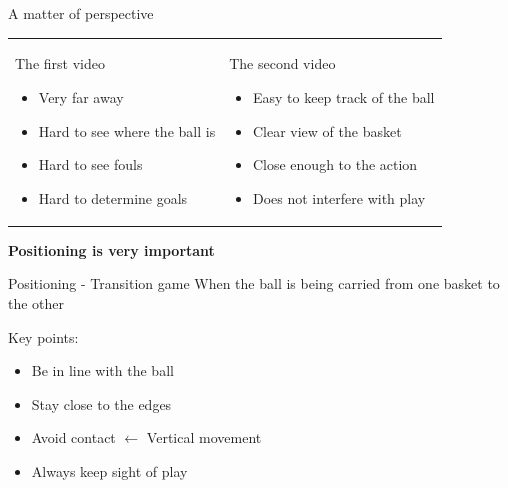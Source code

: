 \documentclass{beamer}
\begin{document}
    \begin{frame}{A matter of perspective}
        \begin{tabular}{ll}
            \parbox{0.5\linewidth}{
                The first video
                \begin{itemize}
                    \item Very far away
                    \item Hard to see where the ball is
                    \item Hard to see fouls
                    \item Hard to determine goals
                \end{itemize}
                \pause
            }
            &
            \parbox{0.5\linewidth}{
                The second video
                \begin{itemize}
                    \item Easy to keep track of the ball
                    \item Clear view of the basket
                    \item Close enough to the action
                    \item Does not interfere with play
                \end{itemize}
            }
        \end{tabular}
        \pause
        \begin{center}
            \textbf{Positioning is very important}
        \end{center}
    \end{frame}

    \begin{frame}{Positioning - Transition game}
        When the ball is being carried from one basket to the other

        \pause

        \vspace{0.75cm}

        Key points:
        \begin{itemize}
            \item Be in line with the ball
            \item Stay close to the edges
            \item Avoid contact $\leftarrow$ Vertical movement
            \item Always keep sight of play
        \end{itemize}
    \end{frame}
\end{document}
